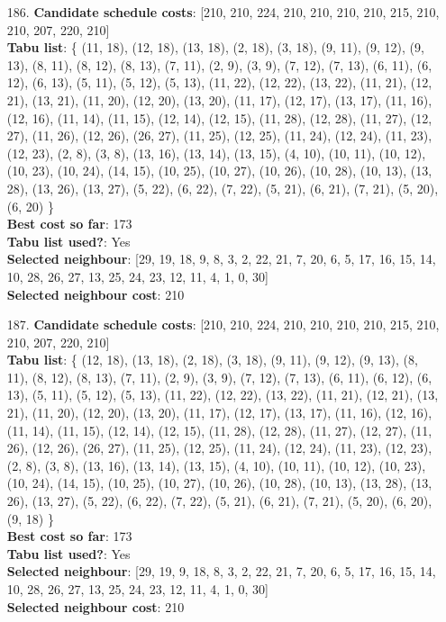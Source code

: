 \documentclass[fleqn]{article}
\begin{document}
\begin{itemize}
    \item[186.] \textbf{Candidate schedule costs}: [210, 210, 224, 210, 210, 210, 210, 215, 210, 210, 207, 220, 210] \\
    \textbf{Tabu list}: \{ (11, 18), (12, 18), (13, 18), (2, 18), (3, 18), (9, 11), (9, 12), (9, 13), (8, 11), (8, 12), (8, 13), (7, 11), (2, 9), (3, 9), (7, 12), (7, 13), (6, 11), (6, 12), (6, 13), (5, 11), (5, 12), (5, 13), (11, 22), (12, 22), (13, 22), (11, 21), (12, 21), (13, 21), (11, 20), (12, 20), (13, 20), (11, 17), (12, 17), (13, 17), (11, 16), (12, 16), (11, 14), (11, 15), (12, 14), (12, 15), (11, 28), (12, 28), (11, 27), (12, 27), (11, 26), (12, 26), (26, 27), (11, 25), (12, 25), (11, 24), (12, 24), (11, 23), (12, 23), (2, 8), (3, 8), (13, 16), (13, 14), (13, 15), (4, 10), (10, 11), (10, 12), (10, 23), (10, 24), (14, 15), (10, 25), (10, 27), (10, 26), (10, 28), (10, 13), (13, 28), (13, 26), (13, 27), (5, 22), (6, 22), (7, 22), (5, 21), (6, 21), (7, 21), (5, 20), (6, 20) \} \\
    \textbf{Best cost so far}: 173 \\
    \textbf{Tabu list used?}: Yes \\
    \textbf{Selected neighbour}: [29, 19, 18, 9, 8, 3, 2, 22, 21, 7, 20, 6, 5, 17, 16, 15, 14, 10, 28, 26, 27, 13, 25, 24, 23, 12, 11, 4, 1, 0, 30] \\
    \textbf{Selected neighbour cost}: 210
      

    \item[187.] \textbf{Candidate schedule costs}: [210, 210, 224, 210, 210, 210, 210, 215, 210, 210, 207, 220, 210] \\
    \textbf{Tabu list}: \{ (12, 18), (13, 18), (2, 18), (3, 18), (9, 11), (9, 12), (9, 13), (8, 11), (8, 12), (8, 13), (7, 11), (2, 9), (3, 9), (7, 12), (7, 13), (6, 11), (6, 12), (6, 13), (5, 11), (5, 12), (5, 13), (11, 22), (12, 22), (13, 22), (11, 21), (12, 21), (13, 21), (11, 20), (12, 20), (13, 20), (11, 17), (12, 17), (13, 17), (11, 16), (12, 16), (11, 14), (11, 15), (12, 14), (12, 15), (11, 28), (12, 28), (11, 27), (12, 27), (11, 26), (12, 26), (26, 27), (11, 25), (12, 25), (11, 24), (12, 24), (11, 23), (12, 23), (2, 8), (3, 8), (13, 16), (13, 14), (13, 15), (4, 10), (10, 11), (10, 12), (10, 23), (10, 24), (14, 15), (10, 25), (10, 27), (10, 26), (10, 28), (10, 13), (13, 28), (13, 26), (13, 27), (5, 22), (6, 22), (7, 22), (5, 21), (6, 21), (7, 21), (5, 20), (6, 20), (9, 18) \} \\
    \textbf{Best cost so far}: 173 \\
    \textbf{Tabu list used?}: Yes \\
    \textbf{Selected neighbour}: [29, 19, 9, 18, 8, 3, 2, 22, 21, 7, 20, 6, 5, 17, 16, 15, 14, 10, 28, 26, 27, 13, 25, 24, 23, 12, 11, 4, 1, 0, 30] \\
    \textbf{Selected neighbour cost}: 210
      


\end{itemize}
\end{document}
